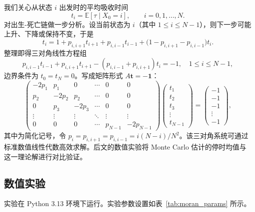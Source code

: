 我们关心从状态 $i$ 出发时的平均吸收时间
\begin{equation}
  t_i = \mathbb{E}[\tau \mid X_0 = i], \qquad i = 0,1,\dots,N.
\end{equation}
对出生-死亡链做一步分析。设当前状态为 $i$（其中 $1 \leqslant i \leqslant N-1$），则下一步可能上升、下降或保持不变，于是
\begin{equation}
  t_i
  = 1 + p_{i,i+1} t_{i+1} + p_{i,i-1} t_{i-1}
    + \bigl(1-p_{i,i+1}-p_{i,i-1}\bigr)t_i.
\end{equation}
整理即得三对角线性方程组
\begin{equation}\label{eq:moran_tri}
  p_{i,i-1} t_{i-1} + p_{i,i+1} t_{i+1} - (p_{i,i-1} + p_{i,i+1}) t_i = -1, \quad 1 \leqslant i \leqslant N-1,
\end{equation}
边界条件为 $t_0 = t_N = 0$。写成矩阵形式 $A \mathbf{t} = -\mathbf{1}$：
\begin{equation}\label{eq:moran_matrix}
  \begin{pmatrix}
    -2p_1 & p_1 & 0 & \cdots & 0 & 0 \\
    p_2 & -2p_2 & p_2 & \cdots & 0 & 0 \\
    0 & p_3 & -2p_3 & \cdots & 0 & 0 \\
    \vdots & \vdots & \vdots & \ddots & \vdots & \vdots \\
    0 & 0 & 0 & \cdots & p_{N-1} & -2p_{N-1}
  \end{pmatrix}
  \begin{pmatrix} t_1 \\ t_2 \\ t_3 \\ \vdots \\ t_{N-1} \end{pmatrix}
  =
  \begin{pmatrix} -1 \\ -1 \\ -1 \\ \vdots \\ -1 \end{pmatrix},
\end{equation}
其中为简化记号，令 $p_i = p_{i,i+1} = p_{i,i-1} = i(N-i)/N^2$。该三对角系统可通过标准数值线性代数高效求解。后文的数值实验将 Monte Carlo 估计的停时均值与这一理论解进行对比验证。

\subsection{数值实验}

实验在 Python 3.13 环境下运行。实验参数设置如表~\ref{tab:moran_params} 所示。

